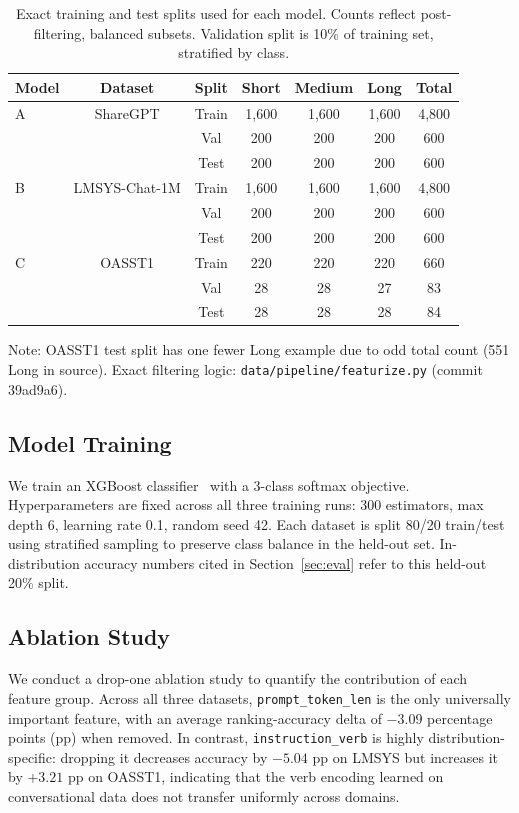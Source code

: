 \documentclass[10pt]{article}
\begin{document}
\begin{table}[H]
\centering
\caption{Exact training and test splits used for each model. Counts reflect post-filtering, balanced subsets. Validation split is 10\% of training set, stratified by class.}
\label{tab:splits}
\small
\begin{tabular}{lcccccc}
\toprule
Model & Dataset & Split & Short & Medium & Long & Total \\
\midrule
A & ShareGPT & Train & 1,600 & 1,600 & 1,600 & 4,800 \\
 & & Val & 200 & 200 & 200 & 600 \\
 & & Test & 200 & 200 & 200 & 600 \\
B & LMSYS-Chat-1M & Train & 1,600 & 1,600 & 1,600 & 4,800 \\
 & & Val & 200 & 200 & 200 & 600 \\
 & & Test & 200 & 200 & 200 & 600 \\
C & OASST1 & Train & 220 & 220 & 220 & 660 \\
 & & Val & 28 & 28 & 27 & 83 \\
 & & Test & 28 & 28 & 28 & 84 \\
\bottomrule
\end{tabular}
\par\smallskip
\raggedright\footnotesize
Note: OASST1 test split has one fewer Long example due to odd total count (551 Long in source). Exact filtering logic: \texttt{data/pipeline/featurize.py} (commit 39ad9a6).
\end{table}

\subsection{Model Training}
\label{sec:training}

We train an XGBoost classifier~\cite{chen2016xgboost} with a 3-class softmax objective. Hyperparameters are fixed across all three training runs: 300 estimators, max depth 6, learning rate 0.1, random seed 42. Each dataset is split 80/20 train/test using stratified sampling to preserve class balance in the held-out set. In-distribution accuracy numbers cited in Section~\ref{sec:eval} refer to this held-out 20\% split.

\subsection{Ablation Study}
\label{sec:ablation}

We conduct a drop-one ablation study to quantify the contribution of each feature group. Across all three datasets, \texttt{prompt\_token\_len} is the only universally important feature, with an average ranking-accuracy delta of $-3.09$ percentage points (pp) when removed. In contrast, \texttt{instruction\_verb} is highly distribution-specific: dropping it decreases accuracy by $-5.04$ pp on LMSYS but increases it by $+3.21$ pp on OASST1, indicating that the verb encoding learned on conversational data does not transfer uniformly across domains.
\end{document}
